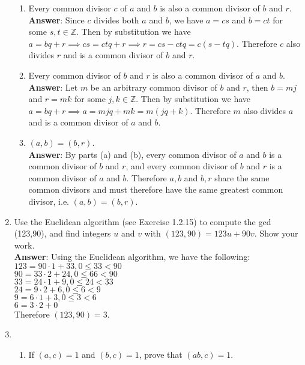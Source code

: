 \documentclass{article}
\begin{document}
\begin{enumerate}
\begin{enumerate}
                  \item Every common divisor $c$ of $a$ and $b$ is also a common divisor of $b$ and $r$.\\
                        \textbf{Answer}: Since $c$ divides both $a$ and $b$, we have $a=cs$ and $b=ct$ for some $s,t\in\mathbb{Z}$. Then by substitution we have $a=bq+r\implies cs=ctq+r\implies r=cs-ctq=c(s-tq)$. Therefore $c$ also divides $r$ and is a common divisor of $b$ and $r$.
                  \item Every common divisor of $b$ and $r$ is also a common divisor of $a$ and $b$.\\
                        \textbf{Answer}: Let $m$ be an arbitrary common divisor of $b$ and $r$, then $b=mj$ and $r=mk$ for some $j,k\in\mathbb{Z}$. Then by substitution we have $a=bq+r\implies a=mjq+mk=m(jq+k)$. Therefore $m$ also divides $a$ and is a common divisor of $a$ and $b$.
                  \item $(a,b)=(b,r)$.\\
                        \textbf{Answer}: By parts (a) and (b), every common divisor of $a$ and $b$ is a common divisor of $b$ and $r$, and every common divisor of $b$ and $r$ is a common divisor of $a$ and $b$. Therefore $a,b$ and $b,r$ share the same common divisors and must therefore have the same greatest common divisor, i.e. $(a,b)=(b,r)$.
            \end{enumerate}
      \item Use the Euclidean algorithm (see Exercise 1.2.15) to compute the gcd (123,90), and find integers $u$ and $v$ with $(123,90)=123u+90v$. Show your work.\\
            \textbf{Answer}: Using the Euclidean algorithm, we have the following:\\
            $123=90\cdot 1+33, 0\leq 33<90$\\
            $90=33\cdot 2+24, 0\leq 66<90$\\
            $33=24\cdot 1+9, 0\leq 24<33$\\
            $24=9\cdot 2+6, 0\leq 6<9$\\
            $9=6\cdot 1+3, 0\leq 3<6$\\
            $6=3\cdot 2+0$\\
            Therefore $(123,90)=3$.
      \item \begin{enumerate}
                  \item If $(a,c)=1$ and $(b,c)=1$, prove that $(ab,c)=1$.\\

\end{enumerate}
\end{enumerate}
\end{document}
